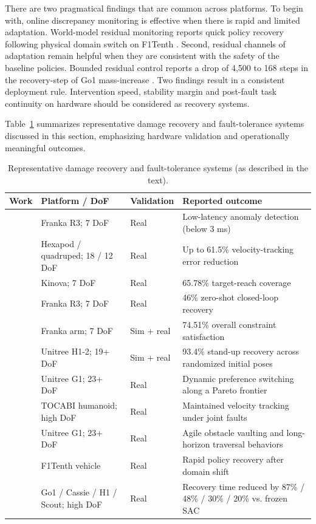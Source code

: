 \documentclass[11pt,a4paper]{article}
\begin{document}
There are two pragmatical findings that are common across platforms. To begin with, online discrepancy monitoring is effective when there is rapid and limited adaptation. World-model residual monitoring reports quick policy recovery following physical domain switch on F1Tenth \cite{domberg2026selfadapting}. Second, residual channels of adaptation remain helpful when they are consistent with the safety of the baseline policies. Bounded residual control reports a drop of 4,500 to 168 steps in the recovery-step of Go1 mass-increase \cite{jayasinghe2026residual}. Two findings result in a consistent deployment rule. Intervention speed, stability margin and post-fault task continuity on hardware should be considered as recovery systems.

Table~\ref{tab:damage_recovery_methods} summarizes representative damage recovery and fault-tolerance systems discussed in this section, emphasizing hardware validation and operationally meaningful outcomes.

\begin{table}[t]
\centering
\caption{Representative damage recovery and fault-tolerance systems (as described in the text).}
\label{tab:damage_recovery_methods}
\renewcommand{\arraystretch}{1.15}
\footnotesize
\begin{tabularx}{\textwidth}{@{}p{2.6cm}p{3.2cm}p{2.0cm}X@{}}
\toprule
Work & Platform / DoF & Validation & Reported outcome \\
\midrule
\cite{grambow2026anomaly} & Franka R3; 7 DoF & Real & Low-latency anomaly detection (below 3 ms) \\
\cite{fu2025contrastive} & Hexapod / quadruped; 18 / 12 DoF & Real & Up to 61.5\% velocity-tracking error reduction \\
\cite{chen2024vlm} & Kinova; 7 DoF & Real & 65.78\% target-reach coverage \\
\cite{li2025dream2fix} & Franka R3; 7 DoF & Real & 46\% zero-shot closed-loop recovery \\
\cite{briscoe2025deft} & Franka arm; 7 DoF & Sim + real & 74.51\% overall constraint satisfaction \\
\cite{poddar2026embedding} & Unitree H1-2; 19+ DoF & Sim + real & 93.4\% stand-up recovery across randomized initial poses \\
\cite{li2026pchc} & Unitree G1; 23+ DoF & Real & Dynamic preference switching along a Pareto frontier \\
\cite{lee2026tolebi} & TOCABI humanoid; high DoF & Real & Maintained velocity tracking under joint faults \\
\cite{wu2026parkour} & Unitree G1; 23+ DoF & Real & Agile obstacle vaulting and long-horizon traversal behaviors \\
\cite{domberg2026selfadapting} & F1Tenth vehicle & Real & Rapid policy recovery after domain shift \\
\cite{jayasinghe2026residual} & Go1 / Cassie / H1 / Scout; high DoF & Real & Recovery time reduced by 87\% / 48\% / 30\% / 20\% vs. frozen SAC \\
\bottomrule
\end{tabularx}
\end{table}
\end{document}
